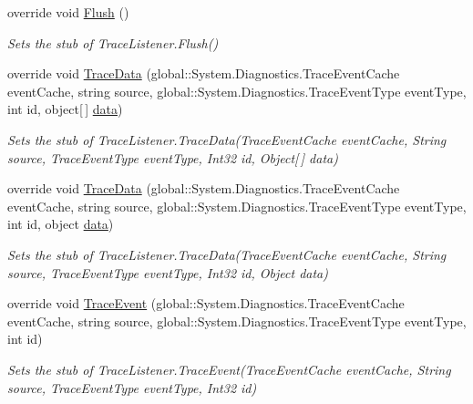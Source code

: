 \begin{DoxyCompactItemize}
override void \hyperlink{class_system_1_1_diagnostics_1_1_fakes_1_1_stub_default_trace_listener_a236e381847e01c5650396fc03b772d44}{Flush} ()
\begin{DoxyCompactList}\small\item\em Sets the stub of Trace\-Listener.\-Flush()\end{DoxyCompactList}\item 
override void \hyperlink{class_system_1_1_diagnostics_1_1_fakes_1_1_stub_default_trace_listener_aac8e64ee0016412703f95a20ec4d8fb3}{Trace\-Data} (global\-::\-System.\-Diagnostics.\-Trace\-Event\-Cache event\-Cache, string source, global\-::\-System.\-Diagnostics.\-Trace\-Event\-Type event\-Type, int id, object\mbox{[}$\,$\mbox{]} \hyperlink{jquery-1_810_82-vsdoc_8js_a609407b3456fdc3c5671a9fc4a226ff7}{data})
\begin{DoxyCompactList}\small\item\em Sets the stub of Trace\-Listener.\-Trace\-Data(\-Trace\-Event\-Cache event\-Cache, String source, Trace\-Event\-Type event\-Type, Int32 id, Object\mbox{[}$\,$\mbox{]} data)\end{DoxyCompactList}\item 
override void \hyperlink{class_system_1_1_diagnostics_1_1_fakes_1_1_stub_default_trace_listener_ade4cbd03ea2b327f035391d42c16d456}{Trace\-Data} (global\-::\-System.\-Diagnostics.\-Trace\-Event\-Cache event\-Cache, string source, global\-::\-System.\-Diagnostics.\-Trace\-Event\-Type event\-Type, int id, object \hyperlink{jquery-1_810_82-vsdoc_8js_a609407b3456fdc3c5671a9fc4a226ff7}{data})
\begin{DoxyCompactList}\small\item\em Sets the stub of Trace\-Listener.\-Trace\-Data(\-Trace\-Event\-Cache event\-Cache, String source, Trace\-Event\-Type event\-Type, Int32 id, Object data)\end{DoxyCompactList}\item 
override void \hyperlink{class_system_1_1_diagnostics_1_1_fakes_1_1_stub_default_trace_listener_aaf51218a0929b4bd5dc92835bdb0416d}{Trace\-Event} (global\-::\-System.\-Diagnostics.\-Trace\-Event\-Cache event\-Cache, string source, global\-::\-System.\-Diagnostics.\-Trace\-Event\-Type event\-Type, int id)
\begin{DoxyCompactList}\small\item\em Sets the stub of Trace\-Listener.\-Trace\-Event(\-Trace\-Event\-Cache event\-Cache, String source, Trace\-Event\-Type event\-Type, Int32 id)\end{DoxyCompactList}\item 

\end{DoxyCompactItemize}
